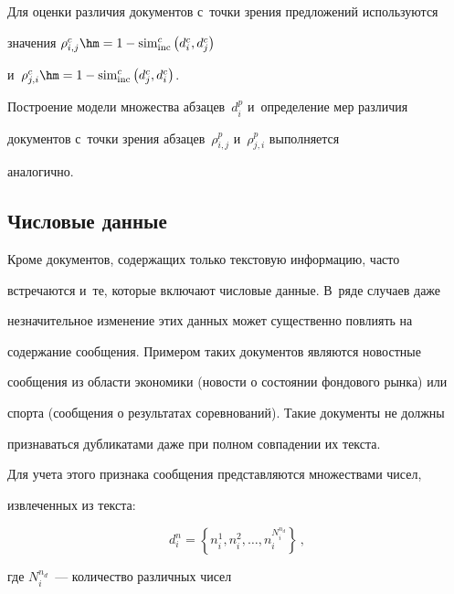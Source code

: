   Для оценки различия документов с~точки зрения предложений используются

значения  $\rho_{i,j}^c\hm= 1-\mathrm{sim}^c_{\mathrm{inc}}\left(d_i^c,d_j^c\right)$

и~$\rho_{j,i}^c\hm= 1-\mathrm{sim}^c_{\mathrm{inc}}\left(d_j^c,d_i^c\right)$.



  Построение модели множества абзацев~$d_i^p$ и~определение мер различия

документов с~точки зрения абзацев~$\rho^p_{i,j}$ и~$\rho^p_{j,i}$ выполняется

аналогично.



\vspace*{-4pt}



\subsection{Числовые данные}



\vspace*{-2pt}



  Кроме документов, содержащих только текстовую информацию, часто

встречаются и~те, которые включают числовые данные. В~ряде случаев даже

незначительное изменение этих данных может существенно повлиять на

содержание сообщения. Примером таких документов являются новостные

сообщения из области экономики (новости о состоянии фондового рынка) или

спорта (сообщения о результатах соревнований). Такие документы не должны

признаваться дубликатами даже при полном совпадении их текста.



  Для учета этого признака сообщения представляются множествами чисел,

извлеченных из текста:



\noindent

$$

d_i^n= \left\{ n_i^1, n_i^2, \ldots , n_i^{N_i^{n_d}}\right\}\,,

$$

 где $N_i^{n_d}$~--- количество различных чисел

